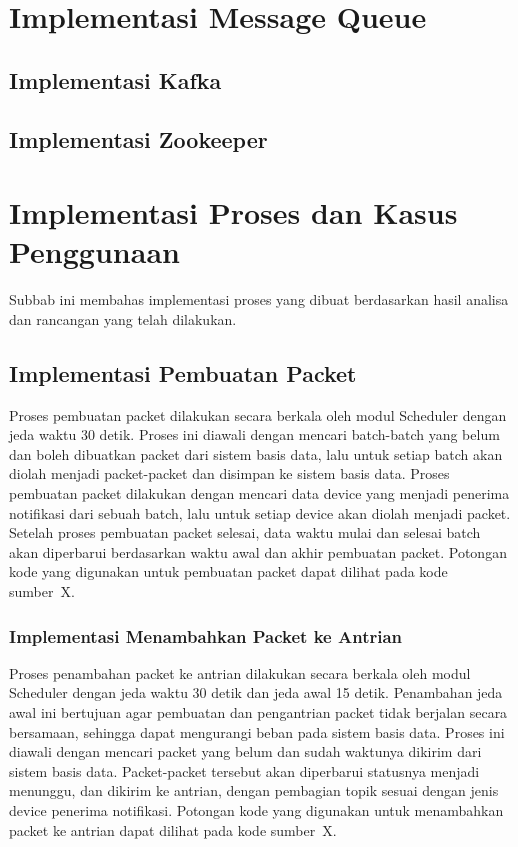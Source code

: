 \section{Implementasi Message Queue}

\subsection{Implementasi Kafka}

\subsection{Implementasi Zookeeper}

\section{Implementasi Proses dan Kasus Penggunaan}
\par Subbab ini membahas implementasi proses yang dibuat berdasarkan hasil analisa dan rancangan yang telah dilakukan.

\subsection{Implementasi Pembuatan Packet}
\par Proses pembuatan packet dilakukan secara berkala oleh modul Scheduler dengan jeda waktu 30 detik. Proses ini diawali dengan mencari batch-batch yang belum dan boleh dibuatkan packet dari sistem basis data, lalu untuk setiap batch akan diolah menjadi packet-packet dan disimpan ke sistem basis data. Proses pembuatan packet dilakukan dengan mencari data device yang menjadi penerima notifikasi dari sebuah batch, lalu untuk setiap device akan diolah menjadi packet. Setelah proses pembuatan packet selesai, data waktu mulai dan selesai batch akan diperbarui berdasarkan waktu awal dan akhir pembuatan packet. Potongan kode yang digunakan untuk pembuatan packet dapat dilihat pada kode sumber~X.

\subsubsection{Implementasi Menambahkan Packet ke Antrian}
\par Proses penambahan packet ke antrian dilakukan secara berkala oleh modul Scheduler dengan jeda waktu 30 detik dan jeda awal 15 detik. Penambahan jeda awal ini bertujuan agar pembuatan dan pengantrian packet tidak berjalan secara bersamaan, sehingga dapat mengurangi beban pada sistem basis data. Proses ini diawali dengan mencari packet yang belum dan sudah waktunya dikirim dari sistem basis data. Packet-packet tersebut akan diperbarui statusnya menjadi menunggu, dan dikirim ke antrian, dengan pembagian topik sesuai dengan jenis device penerima notifikasi. Potongan kode yang digunakan untuk menambahkan packet ke antrian dapat dilihat pada kode sumber~X.

